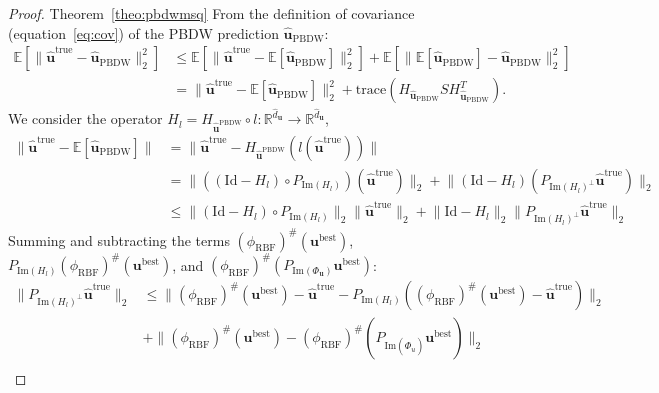 \begin{proof}{Theorem~\ref{theo:pbdwmsq}}
  From the definition of covariance (equation~\eqref{eq:cov}) of the PBDW prediction $\widehat{\mathbf{u}}_{\text{PBDW}}$:
  \begin{align*}
    \mathbb{E}[\lVert \widehat{\mathbf{u}}^{\text{true}}-\widehat{\mathbf{u}}_{\text{PBDW}}\rVert^2_2]&\leq \mathbb{E}[\lVert \widehat{\mathbf{u}}^{\text{true}}-\mathbb{E}[\widehat{\mathbf{u}}_{\text{PBDW}}]\rVert^2_2]+\mathbb{E}[\lVert \mathbb{E}[\widehat{\mathbf{u}}_{\text{PBDW}}]-\widehat{\mathbf{u}}_{\text{PBDW}}\rVert^2_2]\\
    &= \lVert \widehat{\mathbf{u}}^{\text{true}}-\mathbb{E}[\widehat{\mathbf{u}}_{\text{PBDW}}]\rVert^2_2+\text{trace}(H_{\widehat{\mathbf{u}}_{\text{PBDW}}}SH_{\widehat{\mathbf{u}}_{\text{PBDW}}}^T).
  \end{align*}
  We consider the operator $H_l = H_{\widehat{\mathbf{u}}^{\text{PBDW}}}\circ l:\mathbb{R}^{\widehat{d}_{\mathbf u}}\rightarrow\mathbb{R}^{\widehat{d}_{\mathbf u}}$,
  \begin{align*}
    \lVert \widehat{\mathbf{u}}^{\text{true}}-\mathbb{E}[\widehat{\mathbf{u}}_{\text{PBDW}}]\rVert&=\lVert \widehat{\mathbf{u}}^{\text{true}}-H_{\widehat{\mathbf{u}}^{\text{PBDW}}}(l(\widehat{\mathbf{u}}^{\text{true}}))\rVert \\
    &= \lVert \left((\text{Id}-H_l)\circ P_{\text{Im}(H_l)}\right)(\widehat{\mathbf{u}}^{\text{true}})\rVert_2+\lVert (\text{Id}-H_l)(P_{\text{Im}(H_l)^{\perp}}\widehat{\mathbf{u}}^{\text{true}})\rVert_2\\
    &\leq \lVert(\text{Id}-H_l)\circ P_{\text{Im}(H_l)}\rVert_2\lVert \widehat{\mathbf{u}}^{\text{true}}\rVert_2+\lVert\text{Id}-H_l\rVert_2 \lVert P_{\text{Im}(H_l)^{\perp}}\widehat{\mathbf{u}}^{\text{true}}\rVert_2
  \end{align*}
  Summing and subtracting the terms $(\phi_{\text{RBF}})^{\#}({\mathbf u}^{\text{best}})$, $P_{{\text{Im}(H_l)}}(\phi_{\text{RBF}})^{\#}({\mathbf u}^{\text{best}})$, and $(\phi_{\text{RBF}})^{\#}(P_{\text{Im}(\Phi_{\mathbf u})} {\mathbf u}^{\text{best}})$:
  \begin{align*}
    \lVert P_{\text{Im}(H_l)^{\perp}}\widehat{\mathbf{u}}^{\text{true}}\rVert_2 &\leq\lVert(\phi_{\text{RBF}})^{\#}({\mathbf u}^{\text{best}})-\widehat{\mathbf{u}}^{\text{true}}-P_{{\text{Im}(H_l)}}((\phi_{\text{RBF}})^{\#}({\mathbf u}^{\text{best}})-\widehat{\mathbf{u}}^{\text{true}})\rVert_2\\
    &+\lVert (\phi_{\text{RBF}})^{\#}({\mathbf u}^{\text{best}})-(\phi_{\text{RBF}})^{\#}(P_{\text{Im}(\widehat{\Phi}_{u})} {\mathbf u}^{\text{best}})\rVert_2\\

\end{align*}
\end{proof}
